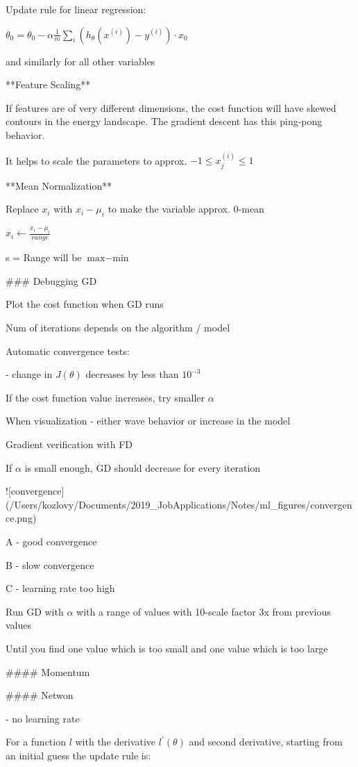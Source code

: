 Update rule for linear regression:

$\theta_0 = \theta_0 -\alpha\frac{1}{m}\sum_i (h_\theta(x^{(i)})-y^{(i)})\cdot x_0$

and similarly for all other variables

**Feature Scaling**

If features are of very different dimensions, the cost function will have skewed contours in the energy landscape. The gradient descent has this ping-pong behavior.  

It helps to scale the parameters to approx. $-1 \le x_j^{(i)}\le 1$

**Mean Normalization**

Replace $x_i$ with $x_i - \mu_i$ to make the variable approx. 0-mean

$x_i \leftarrow \frac{x_i-\mu_i}{range}$

s = Range will be $\text{max}-\text{min}$

### Debugging GD

Plot the cost function when GD runs

Num of iterations depends on the algorithm / model

Automatic convergence tests:

- change in $J(\theta)$ decreases by less than $10^{-3}$

If the cost function value increases, try smaller $\alpha$

When visualization - either wave behavior or increase in the model

Gradient verification with FD

If $\alpha$ is small enough, GD should decrease for every iteration

![convergence](/Users/kozlovy/Documents/2019_JobApplications/Notes/ml_figures/convergence.png)

A - good convergence

B - slow convergence

C - learning rate too high

Run GD with $\alpha$ with a range of values with 10-scale factor  3x from previous values

Until you find one value which is too small and one value which is too large

#### Momentum

#### Netwon

- no learning rate

For a function $l$ with the derivative $l^\prime(\theta)$ and second derivative, starting from an initial guess the update rule is:

